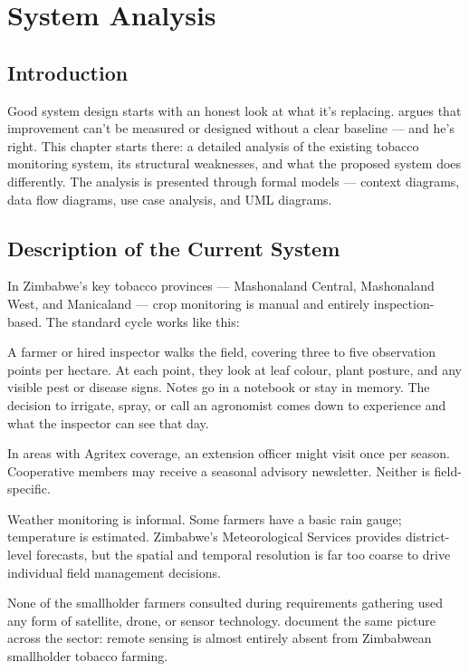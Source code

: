 \documentclass[12pt,a4paper]{report}
\begin{document}
\chapter{System Analysis}

\section{Introduction}

Good system design starts with an honest look at what it's replacing. \citet{wieringa2014} argues that improvement can't be measured or designed without a clear baseline — and he's right. This chapter starts there: a detailed analysis of the existing tobacco monitoring system, its structural weaknesses, and what the proposed system does differently. The analysis is presented through formal models — context diagrams, data flow diagrams, use case analysis, and UML diagrams.

\section{Description of the Current System}

In Zimbabwe's key tobacco provinces — Mashonaland Central, Mashonaland West, and Manicaland — crop monitoring is manual and entirely inspection-based. The standard cycle works like this:

A farmer or hired inspector walks the field, covering three to five observation points per hectare. At each point, they look at leaf colour, plant posture, and any visible pest or disease signs. Notes go in a notebook or stay in memory. The decision to irrigate, spray, or call an agronomist comes down to experience and what the inspector can see that day.

In areas with Agritex coverage, an extension officer might visit once per season. Cooperative members may receive a seasonal advisory newsletter. Neither is field-specific.

Weather monitoring is informal. Some farmers have a basic rain gauge; temperature is estimated. Zimbabwe's Meteorological Services provides district-level forecasts, but the spatial and temporal resolution is far too coarse to drive individual field management decisions.

None of the smallholder farmers consulted during requirements gathering used any form of satellite, drone, or sensor technology. \citet{nyoka2020} document the same picture across the sector: remote sensing is almost entirely absent from Zimbabwean smallholder tobacco farming.
\end{document}
